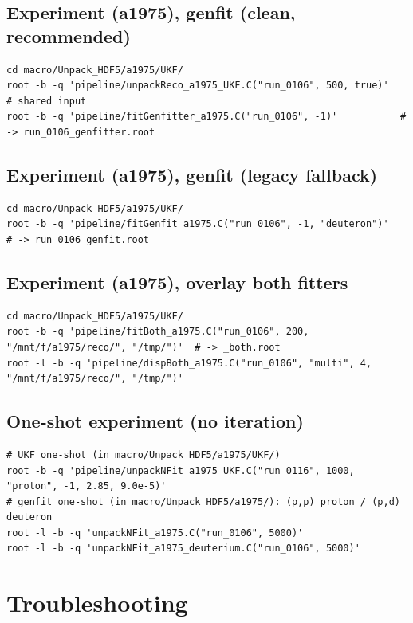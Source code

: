 \documentclass[11pt,a4paper]{article}
\begin{document}
\subsection*{Experiment (a1975), genfit (clean, recommended)}
\begin{lstlisting}[style=bash]
cd macro/Unpack_HDF5/a1975/UKF/
root -b -q 'pipeline/unpackReco_a1975_UKF.C("run_0106", 500, true)'   # shared input
root -b -q 'pipeline/fitGenfitter_a1975.C("run_0106", -1)'           # -> run_0106_genfitter.root
\end{lstlisting}

\subsection*{Experiment (a1975), genfit (legacy fallback)}
\begin{lstlisting}[style=bash]
cd macro/Unpack_HDF5/a1975/UKF/
root -b -q 'pipeline/fitGenfit_a1975.C("run_0106", -1, "deuteron")'   # -> run_0106_genfit.root
\end{lstlisting}

\subsection*{Experiment (a1975), overlay both fitters}
\begin{lstlisting}[style=bash]
cd macro/Unpack_HDF5/a1975/UKF/
root -b -q 'pipeline/fitBoth_a1975.C("run_0106", 200, "/mnt/f/a1975/reco/", "/tmp/")'  # -> _both.root
root -l -b -q 'pipeline/dispBoth_a1975.C("run_0106", "multi", 4, "/mnt/f/a1975/reco/", "/tmp/")'
\end{lstlisting}

\subsection*{One-shot experiment (no iteration)}
\begin{lstlisting}[style=bash]
# UKF one-shot (in macro/Unpack_HDF5/a1975/UKF/)
root -b -q 'pipeline/unpackNFit_a1975_UKF.C("run_0116", 1000, "proton", -1, 2.85, 9.0e-5)'
# genfit one-shot (in macro/Unpack_HDF5/a1975/): (p,p) proton / (p,d) deuteron
root -l -b -q 'unpackNFit_a1975.C("run_0106", 5000)'
root -l -b -q 'unpackNFit_a1975_deuterium.C("run_0106", 5000)'
\end{lstlisting}

\section{Troubleshooting}\label{sec:trouble}
\end{document}
